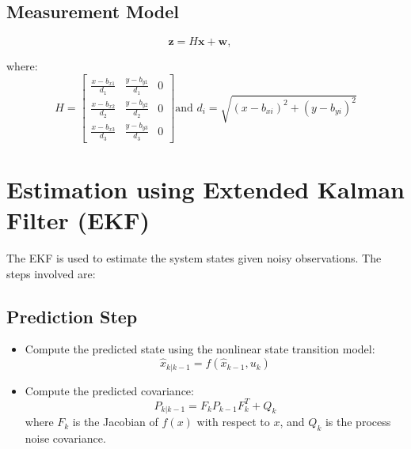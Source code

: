 \documentclass[a4paper,11pt]{article}
\begin{document}
\subsection*{Measurement Model}
\begin{equation*}
    \mathbf{z} = H\mathbf{x} + \mathbf{w}, \quad 
    \end{equation*}


where:
\[
H =
\begin{bmatrix}
\frac{x - b_{x1}}{d_1} & \frac{y - b_{y1}}{d_1} & 0 \\
\frac{x - b_{x2}}{d_2} & \frac{y - b_{y2}}{d_2} & 0 \\
\frac{x - b_{x3}}{d_3} & \frac{y - b_{y3}}{d_3} & 0
\end{bmatrix}
\text{and } d_i = \sqrt{(x - b_{xi})^2 + (y - b_{yi})^2}
\]


\section*{Estimation using Extended Kalman Filter (EKF)}

The EKF is used to estimate the system states given noisy observations. The steps involved are:

\subsection*{Prediction Step}
\begin{itemize}
    \item Compute the predicted state using the nonlinear state transition model:
    \begin{equation}
        \hat{x}_{k|k-1} = f(\hat{x}_{k-1}, u_k)
    \end{equation}
    \item Compute the predicted covariance:
    \begin{equation}
        P_{k|k-1} = F_k P_{k-1} F_k^T + Q_k
    \end{equation}
    where $F_k$ is the Jacobian of $f(x)$ with respect to $x$, and $Q_k$ is the process noise covariance.
\end{itemize}
\end{document}
